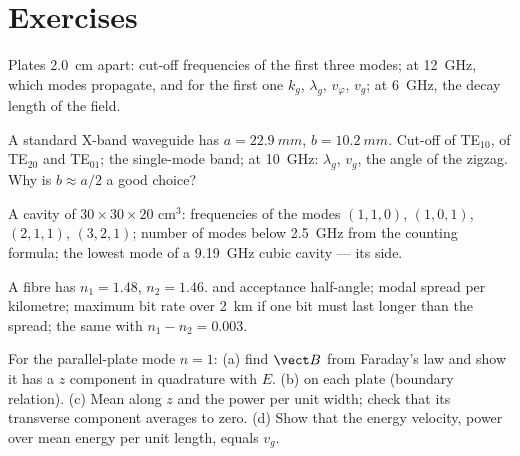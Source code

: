 \section{Exercises}

\begin{exercise}[$\star$]\label{exo:b2:guided-waves:1}
Plates \qty{2.0}{cm} apart: cut-off frequencies of the first three modes;
at \qty{12}{GHz}, which modes propagate, and for the first one $k_g$,
$\lambda_g$, $v_\varphi$, $v_g$; at \qty{6}{GHz}, the decay length of the field.
\end{exercise}

\begin{exercise}[$\star$]\label{exo:b2:guided-waves:2}
A standard X-band waveguide has $a = \qty{22.9}{mm}$, $b = \qty{10.2}{mm}$.
Cut-off of TE$_{10}$, of TE$_{20}$ and TE$_{01}$; the single-mode band; at
\qty{10}{GHz}: $\lambda_g$, $v_g$, the angle of the zigzag. Why is $b \approx a/2$
a good choice?
\end{exercise}

\begin{exercise}[$\star$]\label{exo:b2:guided-waves:3}
A cavity of $30 \times 30 \times 20$ cm$^3$: frequencies of the modes $(1,1,0)$,
$(1,0,1)$, $(2,1,1)$, $(3,2,1)$; number of modes below \qty{2.5}{GHz} from
the counting formula; the lowest mode of a \qty{9.19}{GHz} cubic cavity
--- its side.
\end{exercise}

\begin{exercise}[$\star$]\label{exo:b2:guided-waves:4}
A fibre has $n_1 = 1.48$, $n_2 = 1.46$.  and acceptance
half-angle; modal spread per kilometre; maximum bit rate over
\qty{2}{km} if one bit must last longer than the spread; the same with
$n_1 - n_2 = 0.003$.
\end{exercise}

\begin{exercise}[$\star\star$]\label{exo:b2:guided-waves:5}
For the parallel-plate mode $n = 1$: (a) find $\vect B$ from Faraday's
law and show it has a $z$ component in quadrature with $E$. (b)  on each plate (boundary relation). (c) Mean 
along $z$ and the power per unit width; check that its transverse
component averages to zero. (d) Show that the energy velocity, power
over mean energy per unit length, equals $v_g$.
\end{exercise}


